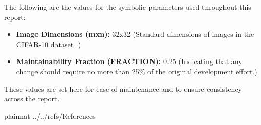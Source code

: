 \documentclass[12pt]{article}
\begin{document}

The following are the values for the symbolic parameters used throughout this report:

\begin{itemize}
  \item \textbf{Image Dimensions (mxn):} 32x32 (Standard dimensions of images in the CIFAR-10 dataset \cite{CIFAR}.)

  \item \textbf{Maintainability Fraction (FRACTION):} 0.25 (Indicating that any change should require no more than 
  25\% of the original development effort.)

\end{itemize}
These values are set here for ease of maintenance and to ensure consistency across the report.

\newpage

 {plainnat}
 {../../refs/References}



\end{document}
